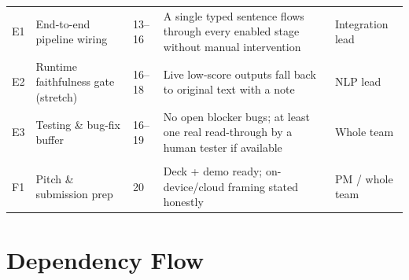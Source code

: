 \documentclass[11pt,a4paper]{article}
\begin{document}
\begin{center}
\begin{longtable}{@{}p{0.7cm}p{4.4cm}p{1.6cm}p{5.3cm}p{2.6cm}@{}}
E1 & End-to-end pipeline wiring & 13--16 & A single typed sentence flows through every enabled stage without manual intervention & Integration lead \\
E2 & Runtime faithfulness gate (stretch) & 16--18 & Live low-score outputs fall back to original text with a note & NLP lead \\
E3 & Testing \& bug-fix buffer & 16--19 & No open blocker bugs; at least one real read-through by a human tester if available & Whole team \\
\addlinespace
\multicolumn{5}{@{}l}{\textit{Group F --- Submission}} \\
F1 & Pitch \& submission prep & 20 & Deck + demo ready; on-device/cloud framing stated honestly & PM / whole team \\
\bottomrule
\end{longtable}
\end{center}

\newpage
\section{Dependency Flow}
\label{sec:critical-path}
\end{document}

